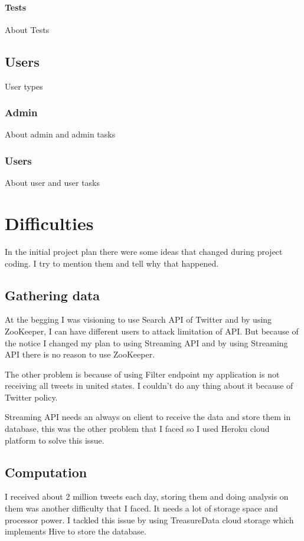 \documentclass[a4paper,11pt]{report}
\begin{document}
\subsubsection{Tests}
About Tests

\section{Users}
User types

\subsection{Admin}
About admin and admin tasks

\subsection{Users}

About user and user tasks

\chapter{Difficulties}
In the initial project plan there were some ideas that changed during project coding. I try to mention them and tell why that happened.
\section{Gathering data}
At the begging I was visioning to use Search API of Twitter and by using ZooKeeper, I can have different users to attack limitation of API. But because of the notice I changed my plan to using Streaming API and by using Streaming API there is no reason to use ZooKeeper.

The other problem is because of using Filter endpoint my application is not receiving all tweets in united states. I couldn't do any thing about it because of Twitter policy.

Streaming API needs an always on client to receive the data and store them in database, this was the other problem that I faced so I used Heroku cloud platform to solve this issue.

\section{Computation}
I received about 2 million tweets each day, storing them and doing analysis on them was another difficulty that I faced. It needs a lot of storage space and processor power. I tackled this issue by using TreasureData cloud storage which implements Hive to store the database.
\end{document}
